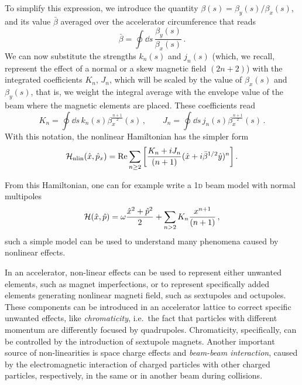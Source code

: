 To simplify this expression, we introduce the quantity $\beta(s)=\beta_y(s)/\beta_x(s)$, and its value $\bar\beta$ averaged over the accelerator circumference that reads
\begin{equation}
    \bar\beta = \oint \dd s\, \frac{\beta_y(s)}{\beta_x(s)} \,.
\end{equation}
We can now substitute the strengths $k_n(s)$ and $j_n(s)$ (which, we recall, represent the effect of a normal or a skew magnetic field $(2n+2)$) with the integrated coefficients $K_n$, $J_n$, which will be scaled by the value of $\beta_x(s)$ and $\beta_y(s)$, that is, we weight the integral average with the envelope value of the beam where the magnetic elements are placed. These coefficients read
%
\begin{equation} 
	K_n = \oint \dd s\, k_n(s) \beta_x^{\frac{n+1}{2}}(s)\,,\qquad
	J_n = \oint \dd s\, j_n(s) \beta_x^{\frac{n+1}{2}}(s)\,.
\end{equation} 
%
With this notation, the nonlinear Hamiltonian has the simpler form
% 
\begin{equation} \mathcal{H}_\text{nlin}(\hat x, \hat p_x) = \Re \sum_{n\ge 2} \qty[\frac{K_n + iJ_n}{(n+1)} (\hat x + i\bar\beta^{1/2} \hat y)^n]\,.\end{equation}

From this Hamiltonian, one can for example write a 1\textsc{d} beam model with normal multipoles
\begin{equation}
	\mathcal{H}(\hat x,\hat p) = \omega \frac{\hat x^2 + \hat p^2}{2} + \sum_{n>2} K_n \frac{x^{n+1}}{(n+1)}\, ,
	\label{eq:hamxp_nl}
\end{equation}
such a simple model can be used to understand many phenomena caused by nonlinear effects.

In an accelerator, non-linear effects can be used to represent either unwanted elements, such as magnet imperfections, or to represent specifically added elements generating nonlinear magneti field, such as sextupoles and octupoles. These components can be introduced in an accelerator lattice to correct specific unwanted effects, like \textit{chromaticity}, i.e.\ the fact that particles with different momentum are differently focused by quadrupoles. Chromaticity, specifically, can be controlled by the introduction of sextupole magnets. Another important source of non-linearities is space charge effects and \textit{beam-beam interaction}, caused by the electromagnetic interaction of charged particles with other charged particles, respectively, in the same or in another beam during collisions.

